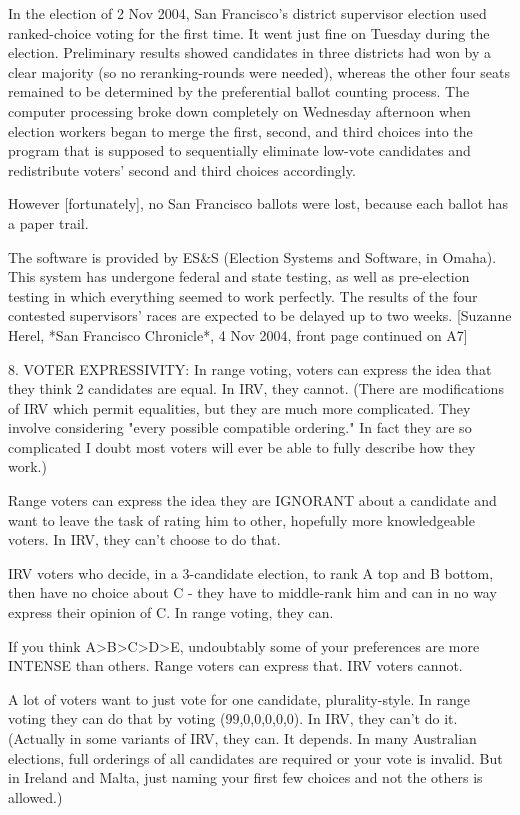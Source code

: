   In the election of 2 Nov 2004, San Francisco's district supervisor
  election used ranked-choice voting for the first time.
  It went just fine on Tuesday during the election.
  Preliminary results showed candidates in three districts had won by a clear
  majority (so no reranking-rounds were needed), whereas the other four seats 
  remained to be determined by the preferential ballot counting process.
  The computer processing broke down completely on Wednesday afternoon when election
  workers began to merge the first, second, and third choices into the
  program that is supposed to sequentially eliminate low-vote candidates
  and redistribute voters' second and third choices accordingly. 

  However [fortunately], no San Francisco ballots were lost, because each ballot has a
  paper trail.

  The software is provided by ES&S (Election Systems and Software, in
  Omaha). This system has undergone federal and state testing, as well
  as pre-election testing in which everything seemed to work perfectly.
  The results of the four contested supervisors' races are expected to be delayed 
  up to two weeks. 
  [Suzanne Herel, *San Francisco Chronicle*, 4 Nov 2004, front page continued on A7]

8. VOTER EXPRESSIVITY:
In range voting, voters can express the idea that they think 2 candidates are equal.
In IRV, they cannot.  (There are modifications of IRV which permit equalities, but
they are much more complicated.  They involve considering "every possible compatible
ordering."   In fact they are so complicated I doubt most voters will ever be able
to fully describe how they work.)

Range voters can express the idea they are IGNORANT about a candidate and want to leave the
task of rating him to other, hopefully more knowledgeable voters.  In IRV, they
can't choose to do that.

IRV voters who decide, in a 3-candidate election, to rank A top and B bottom,
then have no choice about C - they have to middle-rank him and can in no way express
their opinion of C.   In range voting, they can.

If you think  A>B>C>D>E,  undoubtably some of your preferences are more INTENSE 
than others.    Range voters can express that.  IRV voters cannot.

A lot of voters want to just vote for one candidate, plurality-style.
In range voting they can do that by voting (99,0,0,0,0,0).
In IRV, they can't do it.  (Actually in some variants of IRV, they can.
It depends.  In many Australian elections, full orderings of all candidates
are required or your vote is invalid.  But in Ireland and Malta, just naming
your first few choices and not the others is allowed.)

